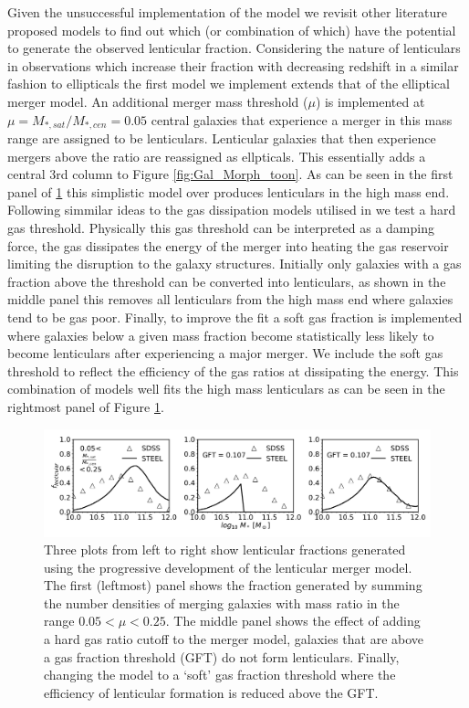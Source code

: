 Given the unsuccessful implementation of the \citet{Cook2009Two-phaseFormation} model we revisit other literature proposed models to find out which (or combination of which) have the potential to generate the observed lenticular fraction. Considering the nature of lenticulars in observations which increase their fraction with decreasing redshift in a similar fashion to ellipticals the first model we implement extends that of the elliptical merger model. An additional merger mass threshold ($\mu$) is implemented at $\mu = M_{*, sat}/M_{*, cen} = 0.05$ central galaxies that experience a merger in this mass range are assigned to be lenticulars. Lenticular galaxies that then experience mergers above the ratio are reassigned as ellpticals. This essentially adds a central 3rd column to Figure \ref{fig:Gal_Morph_toon}. As can be seen in the first panel of \ref{fig:Lentcular_panels} this simplistic model over produces lenticulars in the high mass end. Following simmilar ideas to the gas dissipation models utilised in \citet{Hopkins2009} we test a hard gas threshold. Physically this gas threshold can be interpreted as a damping force, the gas dissipates the energy of the merger into heating the gas reservoir limiting the disruption to the galaxy structures. Initially only galaxies with a gas fraction above the threshold can be converted into lenticulars, as shown in the middle panel this removes all lenticulars from the high mass end where galaxies tend to be gas poor. 
Finally, to improve the fit a soft gas fraction is implemented where galaxies below a given mass fraction become statistically less likely to become lenticulars after experiencing a major merger. We include the soft gas threshold to reflect the efficiency of the gas ratios at dissipating the energy. This combination of models well fits the high mass lenticulars as can be seen in the rightmost panel of Figure \ref{fig:Lentcular_panels}.

\begin{figure}
  \includegraphics[width=\linewidth]{Figures/Chapter5/Lenticular_three.pdf}
    \caption{Three plots from left to right show lenticular fractions generated using the progressive development of the lenticular merger model. The first (leftmost) panel shows the fraction generated by summing the number densities of merging galaxies with mass ratio in the range $0.05 < \mu < 0.25$. The middle panel shows the effect of adding a hard gas ratio cutoff to the merger model, galaxies that are above a gas fraction threshold (GFT) do not form lenticulars. Finally, changing the model to a `soft' gas fraction threshold where the efficiency of lenticular formation is reduced above the GFT.}
    \label{fig:Lentcular_panels}
\end{figure}

